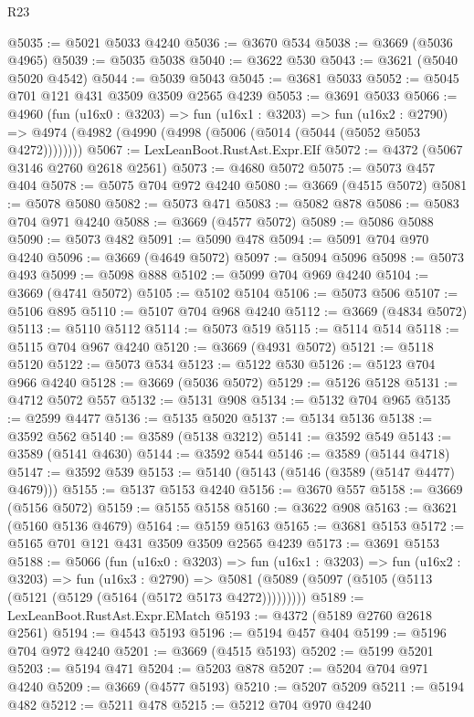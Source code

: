 \begin{lexlean}{R23}
\begin{coremodule}
@5035 := @5021 @5033 @4240
@5036 := @3670 @534
@5038 := @3669 (@5036 @4965)
@5039 := @5035 @5038
@5040 := @3622 @530
@5043 := @3621 (@5040 @5020 @4542)
@5044 := @5039 @5043
@5045 := @3681 @5033
@5052 := @5045 @701 @121 @431 @3509 @3509 @2565 @4239
@5053 := @3691 @5033
@5066 := @4960
    (fun (u16x0 : @3203) =>
    fun (u16x1 : @3203) =>
    fun (u16x2 : @2790) =>
    @4974 (@4982 (@4990 (@4998 (@5006 (@5014 (@5044 (@5052 @5053 @4272))))))))
@5067 := LexLeanBoot.RustAst.Expr.EIf
@5072 := @4372 (@5067 @3146 @2760 @2618 @2561)
@5073 := @4680 @5072
@5075 := @5073 @457 @404
@5078 := @5075 @704 @972 @4240
@5080 := @3669 (@4515 @5072)
@5081 := @5078 @5080
@5082 := @5073 @471
@5083 := @5082 @878
@5086 := @5083 @704 @971 @4240
@5088 := @3669 (@4577 @5072)
@5089 := @5086 @5088
@5090 := @5073 @482
@5091 := @5090 @478
@5094 := @5091 @704 @970 @4240
@5096 := @3669 (@4649 @5072)
@5097 := @5094 @5096
@5098 := @5073 @493
@5099 := @5098 @888
@5102 := @5099 @704 @969 @4240
@5104 := @3669 (@4741 @5072)
@5105 := @5102 @5104
@5106 := @5073 @506
@5107 := @5106 @895
@5110 := @5107 @704 @968 @4240
@5112 := @3669 (@4834 @5072)
@5113 := @5110 @5112
@5114 := @5073 @519
@5115 := @5114 @514
@5118 := @5115 @704 @967 @4240
@5120 := @3669 (@4931 @5072)
@5121 := @5118 @5120
@5122 := @5073 @534
@5123 := @5122 @530
@5126 := @5123 @704 @966 @4240
@5128 := @3669 (@5036 @5072)
@5129 := @5126 @5128
@5131 := @4712 @5072 @557
@5132 := @5131 @908
@5134 := @5132 @704 @965
@5135 := @2599 @4477
@5136 := @5135 @5020
@5137 := @5134 @5136
@5138 := @3592 @562
@5140 := @3589 (@5138 @3212)
@5141 := @3592 @549
@5143 := @3589 (@5141 @4630)
@5144 := @3592 @544
@5146 := @3589 (@5144 @4718)
@5147 := @3592 @539
@5153 := @5140 (@5143 (@5146 (@3589 (@5147 @4477) @4679)))
@5155 := @5137 @5153 @4240
@5156 := @3670 @557
@5158 := @3669 (@5156 @5072)
@5159 := @5155 @5158
@5160 := @3622 @908
@5163 := @3621 (@5160 @5136 @4679)
@5164 := @5159 @5163
@5165 := @3681 @5153
@5172 := @5165 @701 @121 @431 @3509 @3509 @2565 @4239
@5173 := @3691 @5153
@5188 := @5066
    (fun (u16x0 : @3203) =>
    fun (u16x1 : @3203) =>
    fun (u16x2 : @3203) =>
    fun (u16x3 : @2790) =>
    @5081 (@5089 (@5097 (@5105 (@5113 (@5121 (@5129 (@5164 (@5172 @5173 @4272)))))))))
@5189 := LexLeanBoot.RustAst.Expr.EMatch
@5193 := @4372 (@5189 @2760 @2618 @2561)
@5194 := @4543 @5193
@5196 := @5194 @457 @404
@5199 := @5196 @704 @972 @4240
@5201 := @3669 (@4515 @5193)
@5202 := @5199 @5201
@5203 := @5194 @471
@5204 := @5203 @878
@5207 := @5204 @704 @971 @4240
@5209 := @3669 (@4577 @5193)
@5210 := @5207 @5209
@5211 := @5194 @482
@5212 := @5211 @478
@5215 := @5212 @704 @970 @4240

\end{coremodule}
\end{lexlean}
